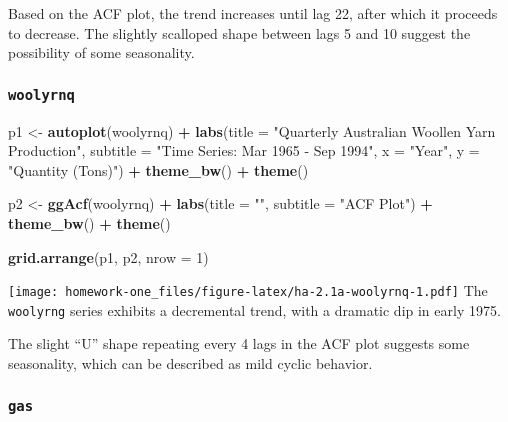 \documentclass[openany]{book}
\newenvironment{Shaded}{\begin{snugshade}}{\end{snugshade}}
\newcommand{\DataTypeTok}[1]{\textcolor[rgb]{0.13,0.29,0.53}{#1}}
\newcommand{\DecValTok}[1]{\textcolor[rgb]{0.00,0.00,0.81}{#1}}
\newcommand{\KeywordTok}[1]{\textcolor[rgb]{0.13,0.29,0.53}{\textbf{#1}}}
\newcommand{\NormalTok}[1]{#1}
\newcommand{\OperatorTok}[1]{\textcolor[rgb]{0.81,0.36,0.00}{\textbf{#1}}}
\newcommand{\StringTok}[1]{\textcolor[rgb]{0.31,0.60,0.02}{#1}}
\begin{document}
Based on the ACF plot, the trend increases until lag 22, after which it proceeds to decrease. The slightly scalloped shape between lags 5 and 10 suggest the possibility of some seasonality.

\hypertarget{woolyrnq}{%
\subsubsection{\texorpdfstring{\texttt{woolyrnq}}{woolyrnq}}\label{woolyrnq}}

\begin{Shaded}
\begin{Highlighting}[]
\NormalTok{p1 <-}\StringTok{ }\KeywordTok{autoplot}\NormalTok{(woolyrnq) }\OperatorTok{+}\StringTok{ }\KeywordTok{labs}\NormalTok{(}\DataTypeTok{title =} \StringTok{"Quarterly Australian Woollen Yarn Production"}\NormalTok{, }
  \DataTypeTok{subtitle =} \StringTok{"Time Series: Mar 1965 - Sep 1994"}\NormalTok{, }\DataTypeTok{x =} \StringTok{"Year"}\NormalTok{, }
  \DataTypeTok{y =} \StringTok{"Quantity (Tons)"}\NormalTok{) }\OperatorTok{+}\StringTok{ }\KeywordTok{theme_bw}\NormalTok{() }\OperatorTok{+}\StringTok{ }\KeywordTok{theme}\NormalTok{()}

\NormalTok{p2 <-}\StringTok{ }\KeywordTok{ggAcf}\NormalTok{(woolyrnq) }\OperatorTok{+}\StringTok{ }\KeywordTok{labs}\NormalTok{(}\DataTypeTok{title =} \StringTok{""}\NormalTok{, }\DataTypeTok{subtitle =} \StringTok{"ACF Plot"}\NormalTok{) }\OperatorTok{+}\StringTok{ }
\StringTok{  }\KeywordTok{theme_bw}\NormalTok{() }\OperatorTok{+}\StringTok{ }\KeywordTok{theme}\NormalTok{()}

\KeywordTok{grid.arrange}\NormalTok{(p1, p2, }\DataTypeTok{nrow =} \DecValTok{1}\NormalTok{)}
\end{Highlighting}
\end{Shaded}

\texttt{[image: homework-one\_files/figure-latex/ha-2.1a-woolyrnq-1.pdf]}
The \texttt{woolyrng} series exhibits a decremental trend, with a dramatic dip in early 1975.

The slight ``U'' shape repeating every 4 lags in the ACF plot suggests some seasonality, which can be described as mild cyclic behavior.

\hypertarget{gas}{%
\subsubsection{\texorpdfstring{\texttt{gas}}{gas}}\label{gas}}
\end{document}
